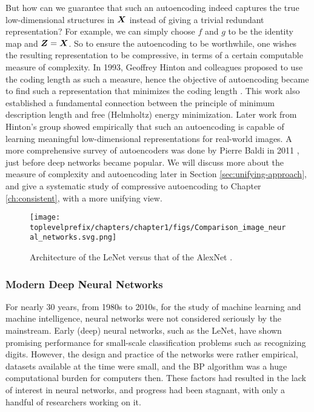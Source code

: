 \documentclass[../../book-main.tex]{subfiles}
\begin{document}
But how can we guarantee that such an autoencoding indeed captures the true low-dimensional structures in $\bm{X}$ instead of giving a trivial redundant representation? For example, we can simply choose $f$ and $g$ to be the identity map and $\bm{Z} = \bm{X}$. So to ensure the autoencoding to be worthwhile, one wishes the resulting representation to be compressive, in terms of a certain computable measure of complexity. In 1993, Geoffrey Hinton and colleagues proposed to use the coding length as such a measure, hence the objective of autoencoding became to find such a representation that minimizes the coding length \cite{Hinton-1993}. This work also established a fundamental connection between the principle of minimum description length \cite{Rissanen-1978} and free (Helmholtz) energy minimization. Later work \cite{Hinton504} from Hinton's group showed empirically that such an autoencoding is capable of learning meaningful low-dimensional representations for real-world images. A more comprehensive survey of autoencoders was done by Pierre Baldi in 2011 \cite{Baldi2011}, just before deep networks became popular. We will discuss more about the measure of complexity and autoencoding later in Section \ref{sec:unifying-approach}, and give a systematic study of compressive autoencoding to Chapter \ref{ch:consistent}, with a more unifying view.


\begin{figure}
    \centering
    \texttt{[image: \\toplevelprefix/chapters/chapter1/figs/Comparison\_image\_neural\_networks.svg.png]}
    \caption{Architecture of the LeNet \cite{LeCun-1989} versus that of the AlexNet \cite{krizhevsky2012imagenet}.}
    \label{fig:LeNet-AlexNet}
\end{figure}


\subsubsection{Modern Deep Neural Networks}
For nearly 30 years, from 1980s to 2010s, for the study of machine learning and machine intelligence, neural networks were not considered seriously by the mainstream. Early (deep) neural networks, such as the LeNet, have shown promising performance for small-scale classification problems such as recognizing digits. However, the design and practice of the networks were rather empirical, datasets available at the time were small, and the BP algorithm was a huge computational burden for computers then. These factors had resulted in the lack of interest in neural networks, and progress had been stagnant, with only a handful of researchers working on it. 
\end{document}
